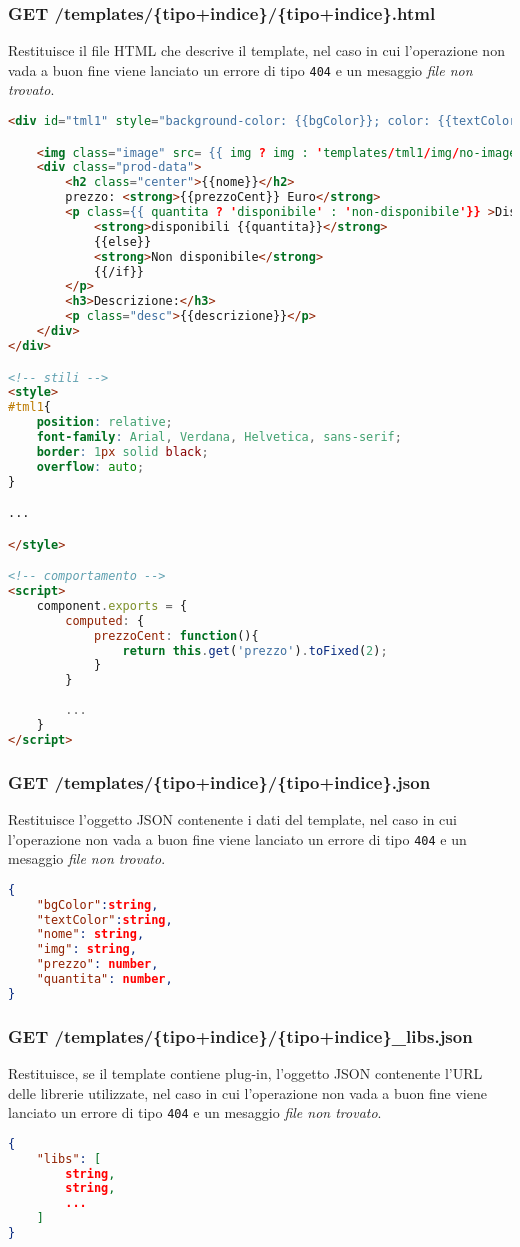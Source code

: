 \subsubsection{GET /templates/\{tipo+indice\}/\{tipo+indice\}.html}
Restituisce il file HTML che descrive il template, nel caso in cui l'operazione non vada a buon fine viene lanciato un errore di tipo \texttt{404} e un mesaggio \textit{file non trovato}.
\begin{lstlisting}[language=HTML, caption=Esempio di template mustache restituito.]
<div id="tml1" style="background-color: {{bgColor}}; color: {{textColor}};">

	<img class="image" src= {{ img ? img : 'templates/tml1/img/no-image.png'}}>
	<div class="prod-data">
		<h2 class="center">{{nome}}</h2>
		prezzo: <strong>{{prezzoCent}} Euro</strong>
		<p class={{ quantita ? 'disponibile' : 'non-disponibile'}} >Disponibilità: {{#if quantita}}
			<strong>disponibili {{quantita}}</strong>
			{{else}}
			<strong>Non disponibile</strong>
			{{/if}}
		</p>
		<h3>Descrizione:</h3>
		<p class="desc">{{descrizione}}</p>
	</div>
</div>

<!-- stili -->
<style>
#tml1{
	position: relative;
	font-family: Arial, Verdana, Helvetica, sans-serif;
	border: 1px solid black;
	overflow: auto;
}

...

</style>

<!-- comportamento -->
<script>
	component.exports = {
		computed: {
			prezzoCent: function(){
				return this.get('prezzo').toFixed(2);
			}
		}
		
		...
	}
</script>
\end{lstlisting}

\subsubsection{GET /templates/\{tipo+indice\}/\{tipo+indice\}.json}
Restituisce l'oggetto JSON contenente i dati del template, nel caso in cui l'operazione non vada a buon fine viene lanciato un errore di tipo \texttt{404} e un mesaggio \textit{file non trovato}.
\begin{lstlisting}[language=JSON, caption=Esempio di oggetto JSON restituito.]
{
	"bgColor":string,
	"textColor":string,
	"nome": string,
	"img": string,
	"prezzo": number,
	"quantita": number,
}
\end{lstlisting}
\subsubsection{GET /templates/\{tipo+indice\}/\{tipo+indice\}\_libs.json}
Restituisce, se il template contiene plug-in, l'oggetto JSON contenente l'URL delle librerie utilizzate, nel caso in cui l'operazione non vada a buon fine viene lanciato un errore di tipo \texttt{404} e un mesaggio \textit{file non trovato}.
\begin{lstlisting}[language=JSON, caption=Esempio di oggetto JSON restituito.]
{
	"libs": [
		string,
		string,
		...
	]
}
\end{lstlisting}

